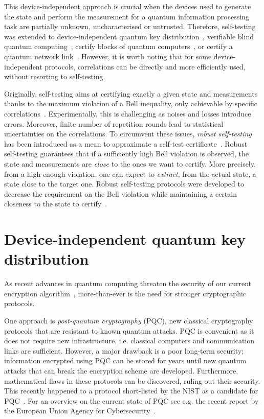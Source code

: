 \medbreak

This device-independent approach is crucial when the devices used to generate the state and perform the measurement for a quantum information processing task are partially unknown, uncharacterised or untrusted.
Therefore, self-testing was extended to device-independent quantum key distribution~\cite{Mayers2004}, verifiable blind quantum computing~\cite{Reichardt2013,Hajdusek2015,McKague2016}, certify blocks of quantum computers~\cite{Magniez2006,Sekatski2018}, or certify a quantum network link~\cite{Bancal2021}.
However, it is worth noting that for some device-independent protocols, correlations can be directly and more efficiently used, without resorting to self-testing.

\medbreak

Originally, self-testing aims at certifying exactly a given state and measurements thanks to the maximum violation of a Bell inequality, only achievable by specific correlations~\cite{Mayers2004}.
Experimentally, this is challenging as noises and losses introduce errors.
Moreover, finite number of repetition rounds lead to statistical uncertainties on the correlations.
To circumvent these issues, \textit{robust self-testing} has been introduced as a mean to approximate a self-test certificate~\cite{Kaniewski2016}.
Robust self-testing guarantees that if a sufficiently high Bell violation is observed, the state and measurements are \textit{close} to the ones we want to certify.
More precisely, from a high enough violation, one can expect to \textit{extract}, from the actual state, a state close to the target one.
Robust self-testing protocols were developed to decrease the requirement on the Bell violation while maintaining a certain closeness to the state to certify~\cite{Bancal2015,Kaniewski2016,Kaniewski2017,Valcarce2022}.

\section{Device-independent quantum key distribution}

As recent advances in quantum computing threaten the security of our current encryption algorithm~\cite{Shor1994,Gouzien2021,Gouzien2023}, more-than-ever is the need for stronger cryptographic protocols. 

One approach is \textit{post-quantum cryptography} (PQC), new classical cryptography protocols that are resistant to known quantum attacks.
PQC is convenient as it does not require new infrastructure, i.e. classical computers and communication links are sufficient. 
However, a major drawback is a poor long-term security; information encrypted using PQC can be stored for years until new quantum attacks that can break the encryption scheme are developed. 
Furthermore, mathematical flaws in these protocols can be discovered, ruling out their security.
This recently happened to a protocol short-listed by the NIST as a candidate for PQC~\cite{Castryck2022}.
For an overview on the current state of PQC see e.g. the recent report by the European Union Agency for Cybersecurity~\cite{EUAC2021}.

